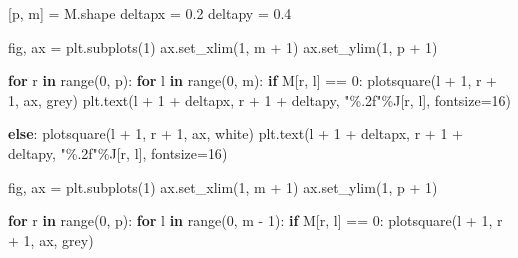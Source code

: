 \documentclass[
]{article}
\newenvironment{Shaded}{\begin{snugshade}}{\end{snugshade}}
\newcommand{\BuiltInTok}[1]{\textcolor[rgb]{0.00,0.23,0.31}{#1}}
\newcommand{\ControlFlowTok}[1]{\textcolor[rgb]{0.00,0.23,0.31}{\textbf{#1}}}
\newcommand{\DecValTok}[1]{\textcolor[rgb]{0.68,0.00,0.00}{#1}}
\newcommand{\FloatTok}[1]{\textcolor[rgb]{0.68,0.00,0.00}{#1}}
\newcommand{\KeywordTok}[1]{\textcolor[rgb]{0.00,0.23,0.31}{\textbf{#1}}}
\newcommand{\NormalTok}[1]{\textcolor[rgb]{0.00,0.23,0.31}{#1}}
\newcommand{\OperatorTok}[1]{\textcolor[rgb]{0.37,0.37,0.37}{#1}}
\newcommand{\SpecialCharTok}[1]{\textcolor[rgb]{0.37,0.37,0.37}{#1}}
\newcommand{\StringTok}[1]{\textcolor[rgb]{0.13,0.47,0.30}{#1}}
\begin{document}
\begin{Shaded}
\begin{Highlighting}[]
\NormalTok{    [p, m] }\OperatorTok{=}\NormalTok{ M.shape}
\NormalTok{    deltapx }\OperatorTok{=} \FloatTok{0.2}
\NormalTok{    deltapy }\OperatorTok{=} \FloatTok{0.4}

\NormalTok{    fig, ax }\OperatorTok{=}\NormalTok{ plt.subplots(}\DecValTok{1}\NormalTok{)}
\NormalTok{    ax.set\_xlim(}\DecValTok{1}\NormalTok{, m }\OperatorTok{+} \DecValTok{1}\NormalTok{)}
\NormalTok{    ax.set\_ylim(}\DecValTok{1}\NormalTok{, p }\OperatorTok{+} \DecValTok{1}\NormalTok{)}

    \ControlFlowTok{for}\NormalTok{ r }\KeywordTok{in} \BuiltInTok{range}\NormalTok{(}\DecValTok{0}\NormalTok{, p):}
        \ControlFlowTok{for}\NormalTok{ l }\KeywordTok{in} \BuiltInTok{range}\NormalTok{(}\DecValTok{0}\NormalTok{, m):}
            \ControlFlowTok{if}\NormalTok{ M[r, l] }\OperatorTok{==} \DecValTok{0}\NormalTok{:}
\NormalTok{                plotsquare(l }\OperatorTok{+} \DecValTok{1}\NormalTok{, r }\OperatorTok{+} \DecValTok{1}\NormalTok{, ax, }\StringTok{\textquotesingle{}grey\textquotesingle{}}\NormalTok{)}
\NormalTok{                plt.text(l }\OperatorTok{+} \DecValTok{1} \OperatorTok{+}\NormalTok{ deltapx, r }\OperatorTok{+} \DecValTok{1} \OperatorTok{+}\NormalTok{ deltapy, }\StringTok{"}\SpecialCharTok{\%.2f}\StringTok{"}\OperatorTok{\%}\NormalTok{J[r, l], fontsize}\OperatorTok{=}\DecValTok{16}\NormalTok{)}
                
            \ControlFlowTok{else}\NormalTok{:}
\NormalTok{                plotsquare(l }\OperatorTok{+} \DecValTok{1}\NormalTok{, r }\OperatorTok{+} \DecValTok{1}\NormalTok{, ax, }\StringTok{\textquotesingle{}white\textquotesingle{}}\NormalTok{)}
\NormalTok{                plt.text(l }\OperatorTok{+} \DecValTok{1} \OperatorTok{+}\NormalTok{ deltapx, r }\OperatorTok{+} \DecValTok{1} \OperatorTok{+}\NormalTok{ deltapy, }\StringTok{"}\SpecialCharTok{\%.2f}\StringTok{"}\OperatorTok{\%}\NormalTok{J[r, l], fontsize}\OperatorTok{=}\DecValTok{16}\NormalTok{)}
  
\NormalTok{    fig, ax }\OperatorTok{=}\NormalTok{ plt.subplots(}\DecValTok{1}\NormalTok{)}
\NormalTok{    ax.set\_xlim(}\DecValTok{1}\NormalTok{, m }\OperatorTok{+} \DecValTok{1}\NormalTok{)}
\NormalTok{    ax.set\_ylim(}\DecValTok{1}\NormalTok{, p }\OperatorTok{+} \DecValTok{1}\NormalTok{)}

    \ControlFlowTok{for}\NormalTok{ r }\KeywordTok{in} \BuiltInTok{range}\NormalTok{(}\DecValTok{0}\NormalTok{, p):}
        \ControlFlowTok{for}\NormalTok{ l }\KeywordTok{in} \BuiltInTok{range}\NormalTok{(}\DecValTok{0}\NormalTok{, m }\OperatorTok{{-}} \DecValTok{1}\NormalTok{):}
            \ControlFlowTok{if}\NormalTok{ M[r, l] }\OperatorTok{==} \DecValTok{0}\NormalTok{:}
\NormalTok{                plotsquare(l }\OperatorTok{+} \DecValTok{1}\NormalTok{, r }\OperatorTok{+} \DecValTok{1}\NormalTok{, ax, }\StringTok{\textquotesingle{}grey\textquotesingle{}}\NormalTok{)}
                

\end{Highlighting}
\end{Shaded}
\end{document}
